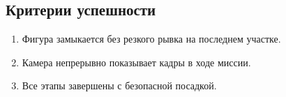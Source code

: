 \subsection{Критерии успешности}
\begin{enumerate}
\item Фигура замыкается без резкого рывка на последнем участке.
\item Камера непрерывно показывает кадры в ходе миссии.
\item Все этапы завершены с безопасной посадкой.
\end{enumerate}
